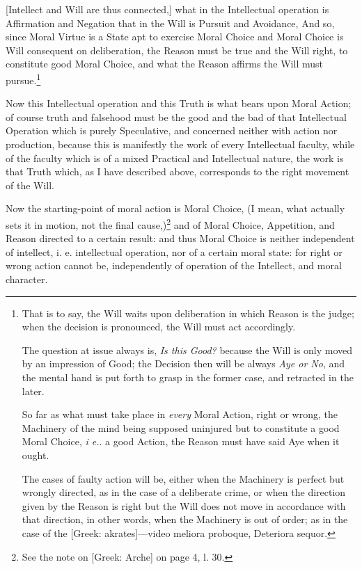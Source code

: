 [Intellect and Will are thus connected,] what in the Intellectual operation is
Affirmation and Negation that in the Will is Pursuit and Avoidance, And so,
since Moral Virtue is a State apt to exercise Moral Choice and Moral Choice is
Will consequent on deliberation, the Reason must be true and the Will right, to
constitute good Moral Choice, and what the Reason affirms the Will must
pursue.\footnote{That is to say, the Will waits upon deliberation in which Reason is the judge;
when the decision is pronounced, the Will must act accordingly.

The question at issue always is, \emph{Is this Good?} because the Will is
only moved by an impression of Good; the Decision then will be always \emph{Aye or
No}, and the mental hand is put forth to grasp in the former case, and
retracted in the later.

So far as what must take place in \emph{every} Moral Action, right or
wrong, the Machinery of the mind being supposed uninjured but to constitute a
good Moral Choice, \emph{i e.}. a good Action, the Reason must have said Aye
when it ought.

The cases of faulty action will be, either when the Machinery is perfect
but wrongly directed, as in the case of a deliberate crime, or when the
direction given by the Reason is right but the Will does not move in accordance
with that direction, in other words, when the Machinery is out of order; as in
the case of the [Greek: akrates]—video meliora proboque, Deteriora
sequor.}

Now this Intellectual operation and this Truth is what bears upon Moral Action;
of course truth and falsehood must be the good and the bad of that Intellectual
Operation which is purely Speculative, and concerned neither with action nor
production, because this is manifestly the work of every Intellectual faculty,
while of the faculty which is of a mixed Practical and Intellectual nature, the
work is that Truth which, as I have described above, corresponds to the right
movement of the Will.

Now the starting-point of moral action is Moral Choice, (I mean, what actually
sets it in motion, not the final cause,)\footnote{See the note on [Greek: Arche] on page 4, l. 30.}
and of Moral Choice, Appetition, and Reason directed to a certain result: and
thus Moral Choice is neither independent of intellect, i. e. intellectual
operation, nor of a certain moral state: for right or wrong action cannot be,
independently of operation of the Intellect, and moral character.

